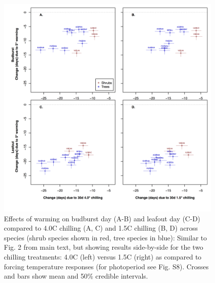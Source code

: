 \documentclass{article}
\begin{document}
\begin{figure}
\label{fig:figS6}
\includegraphics[width=1\textwidth]{FigChill2_4panel.png}
\caption{Effects of warming on budburst day (A-B) and leafout day (C-D) compared to 4.0\degree C chilling (A, C) and 1.5\degree C chilling (B, D) across species (shrub species shown in red, tree species in blue): Similar to Fig. 2 from main text, but showing results side-by-side for the two chilling treatments: 4.0\degree C (left) versus 1.5\degree C (right) as compared to forcing temperature responses (for photoperiod see Fig. S8). Crosses and bars show mean and 50\% credible intervals.}
\end{figure}
\end{document}
